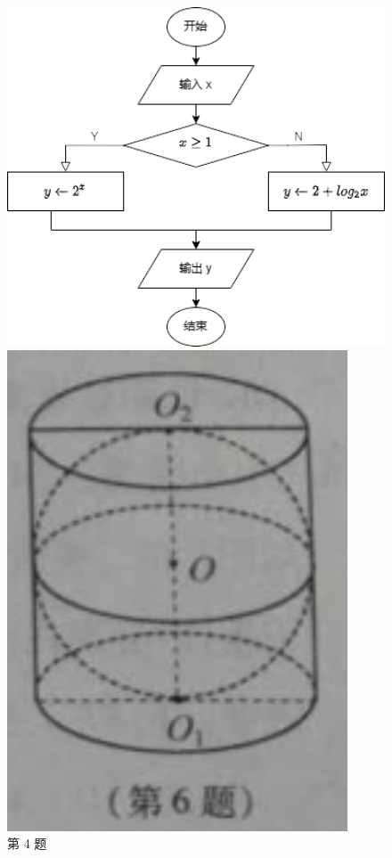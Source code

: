 \documentclass[12pt,space]{ctexart} %
\begin{document}
\begin{enumerate}[itemsep=-0.3em,topsep=0pt]
  \begin{figure}[H]
    \begin{minipage}[b]{0.45\textwidth}
      \centering
      \includegraphics[width=1\textwidth]{Image/js-4.png}
      \caption{第 4 题}\label{fig:a}
    \end{minipage}
    \begin{minipage}[b]{0.25\textwidth}
      \centering
      \includegraphics[width=0.9\textwidth]{Image/js-6.png}

\end{minipage}
\end{figure}
\end{enumerate}
\end{document}
